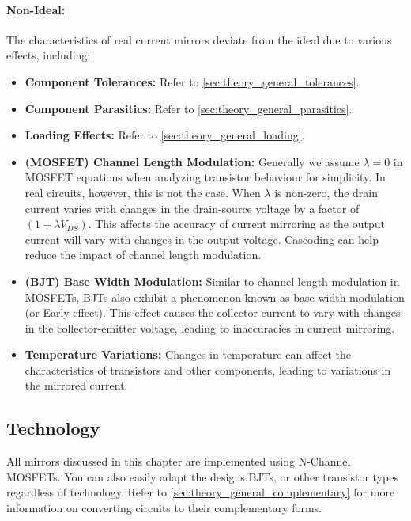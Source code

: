 \paragraph{Non-Ideal:}
The characteristics of real current mirrors deviate from
the ideal due to various effects, including:
\begin{itemize}
  \item \textbf{Component Tolerances:} Refer to
    \ref{sec:theory_general_tolerances}.
  \item \textbf{Component Parasitics:} Refer to
    \ref{sec:theory_general_parasitics}.
  \item \textbf{Loading Effects:} Refer to
    \ref{sec:theory_general_loading}.
  \item \textbf{(MOSFET) Channel Length Modulation:} Generally
    we assume $\lambda = 0$ in MOSFET equations when analyzing
    transistor behaviour for simplicity. In real circuits,
    however, this is not the case. When $\lambda$ is non-zero,
    the drain current varies with changes in the drain-source
    voltage by a factor of $(1 + \lambda V_{DS})$. This affects
    the accuracy of current mirroring as the output current
    will vary with changes in the output voltage. Cascoding
    can help reduce the impact of channel length modulation.
  \item \textbf{(BJT) Base Width Modulation:} Similar to channel length
    modulation in MOSFETs, BJTs also exhibit a phenomenon
    known as base width modulation (or Early effect). This
    effect causes the collector current to vary with changes
    in the collector-emitter voltage, leading to inaccuracies
    in current mirroring.
  \item \textbf{Temperature Variations:} Changes in temperature
    can affect the characteristics of transistors and other
    components, leading to variations in the mirrored current.
\end{itemize}

\subsection{Technology}
All mirrors discussed in this chapter are implemented
using N-Channel MOSFETs. You can also easily adapt the
designs BJTs, or other transistor types regardless of
technology. Refer to \ref{sec:theory_general_complementary}
for more information on converting circuits to their
complementary forms.

